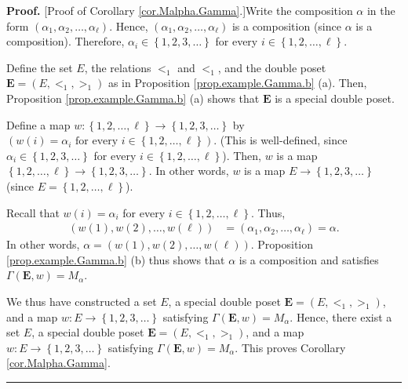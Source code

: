 \documentclass[numbers=enddot,12pt,final,onecolumn,notitlepage,abstracton]{scrartcl}
\theoremstyle{definition}
\newenvironment{proof}[1][Proof]{\noindent\textbf{#1.} }{\ \rule{0.5em}{0.5em}}
\newenvironment{verlong}{}{}
\begin{document}
\begin{verlong}
\begin{footnotesize}
\begin{proof}
[Proof of Corollary \ref{cor.Malpha.Gamma}.]Write the composition $\alpha$ in
the form $\left(  \alpha_{1},\alpha_{2},\ldots,\alpha_{\ell}\right)  $.
Hence, $\left(  \alpha_{1},\alpha_{2},\ldots,\alpha_{\ell}\right)  $ is a
composition (since $\alpha$ is a composition). Therefore, $\alpha_{i}%
\in\left\{  1,2,3,\ldots\right\}  $ for every $i\in\left\{  1,2,\ldots
,\ell\right\}  $.

Define the set $E$, the relations $<_{1}$ and $<_{1}$, and the double poset
${\mathbf{E}} = \left(  E, <_{1}, >_{1}\right)  $ as in Proposition
\ref{prop.example.Gamma.b} (a). Then, Proposition \ref{prop.example.Gamma.b}
(a) shows that $\mathbf{E}$ is a special double poset.

Define a map $w:\left\{  1,2,\ldots,\ell\right\}  \rightarrow\left\{
1,2,3,\ldots\right\}  $ by $\left(  w\left(  i\right)  =\alpha_{i}\text{ for
every }i\in\left\{  1,2,\ldots,\ell\right\}  \right)  $. (This is
well-defined, since $\alpha_{i}\in\left\{  1,2,3,\ldots\right\}  $ for every
$i\in\left\{  1,2,\ldots,\ell\right\}  $). Then, $w$ is a map $\left\{
1,2,\ldots,\ell\right\}  \rightarrow\left\{  1,2,3,\ldots\right\}  $. In other
words, $w$ is a map $E\rightarrow\left\{  1,2,3,\ldots\right\}  $ (since
$E=\left\{  1,2,\ldots,\ell\right\}  $).

Recall that $w\left(  i\right)  =\alpha_{i}$ for every $i\in\left\{
1,2,\ldots,\ell\right\}  $. Thus,
\begin{align*}
\left(  w\left(  1\right)  ,w\left(  2\right)  ,\ldots,w\left(  \ell\right)
\right)   &  =\left(  \alpha_{1},\alpha_{2},\ldots,\alpha_{\ell}\right)
=\alpha.
\end{align*}
In other words, $\alpha=\left(  w\left(  1\right)  ,w\left(  2\right)
,\ldots,w\left(  \ell\right)  \right)  $. Proposition
\ref{prop.example.Gamma.b} (b) thus shows that $\alpha$ is a composition and
satisfies $\Gamma\left(  {\mathbf{E}},w\right)  =M_{\alpha}$.

We thus have constructed a set $E$, a special double poset ${\mathbf{E}%
}=\left(  E,<_{1},>_{1}\right)  $, and a map $w:E\rightarrow\left\{
1,2,3,\ldots\right\}  $ satisfying $\Gamma\left(  {\mathbf{E}},w\right)
=M_{\alpha}$. Hence, there exist a set $E$, a special double poset
${\mathbf{E}}=\left(  E,<_{1},>_{1}\right)  $, and a map $w:E\rightarrow
\left\{  1,2,3,\ldots\right\}  $ satisfying $\Gamma\left(  {\mathbf{E}%
},w\right)  =M_{\alpha}$. This proves Corollary \ref{cor.Malpha.Gamma}.
\end{proof}


\end{footnotesize}
\end{verlong}
\end{document}
